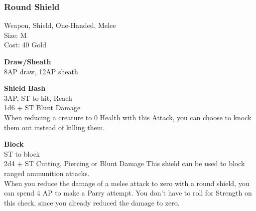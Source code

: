 \subsubsection{Round Shield}\label{weapon:roundShield}
Weapon, Shield, One-Handed, Melee\\
Size: M\\
Cost: 40 Gold

\textbf{Draw/Sheath}\\
8AP draw, 12AP sheath

\textbf{Shield Bash}\\
3AP, ST to hit,  Reach\\
1d6 + \texttimes ST Blunt Damage\\
When reducing a creature to 0 Health with this Attack, you can choose to knock them out instead of killing them.

\textbf{Block}\\
ST to block\\
2d4 + \texttimes ST Cutting, Piercing or Blunt Damage
This shield can be used to block ranged ammunition attacks.\\
When you reduce the damage of a melee attack to zero with a round shield, you can spend 4 AP to make a Parry attempt.
You don't have to roll for Strength on this check, since you already reduced the damage to zero.\\
